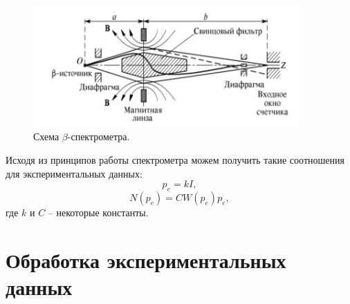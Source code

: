 \documentclass[a4paper, 14pt]{extarticle}%
\newcommand\ECaption[1]{%
     \captionsetup{font=footnotesize}%
     \caption{#1}}
\begin{document}
\begin{figure}[h]
\begin{center}
\includegraphics[width=0.9\textwidth]{ust}
\ECaption{Схема $\beta$-спектрометра.}
\end{center}
\end{figure}

Исходя из принципов работы спектрометра можем получить такие соотношения для экспериментальных данных:
\begin{equation}
p_e = kI,
\end{equation}
\begin{equation}
 N(p_e) = CW(p_e)p_e,
\end{equation}
где $k$ и $C$ -- некоторые константы.

\section*{Обработка экспериментальных данных}
 
\end{document}
